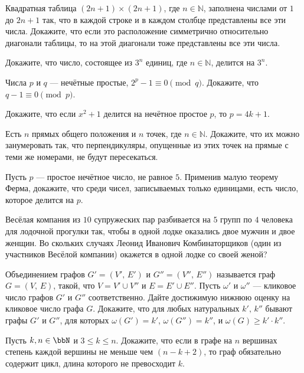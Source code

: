 Квадратная таблица $(2n+1)\times(2n+1)$, где $n\in\mathbb{N}$, заполнена числами от $1$ до $2n+1$ так, что в каждой строке и в каждом столбце представлены все эти числа. Докажите, что если это расположение симметрично относительно диагонали таблицы, то на этой диагонали тоже представлены все эти числа.

Докажите, что число, состоящее из $3^n$ единиц, где $n\in\mathbb{N}$, делится на $3^n$.

Числа $p$ и $q$ --- нечётные простые, $2^p - 1 \equiv 0 \pmod q$. Докажите, что $q - 1 \equiv 0 \pmod p$.

Докажите, что если $x^2+1$ делится на нечётное простое $p$, то $p=4k+1$.


Есть $n$ прямых общего положения и $n$ точек, где $n\in\mathbb{N}$. Докажите, что их можно занумеровать так, что перпендикуляры, опущенные из этих точек на прямые с теми же номерами, не будут пересекаться.


Пусть $p$ --- простое нечётное число, не равное $5$. Применив малую теорему Ферма, докажите, что среди чисел, записываемых только единицами, есть число, которое делится на $p$.

Весёлая компания из $10$ супружеских пар разбивается на $5$ групп по $4$ человека для лодочной прогулки так, чтобы в одной лодке оказались двое мужчин и двое женщин. Во скольких случаях Леонид Иванович Комбинаторщиков (один из участников Весёлой компании) окажется в одной лодке со своей женой?


Объединением графов $G'=(V',\,E')$ и $G''=(V'',\, E'')$ называется граф $G=(V,\,E)$, такой, что $V=V'\cup V''$ и $E=E'\cup E''$. Пусть $\omega'$ и $\omega''$ — кликовое число графов $G'$ и $G''$ соответственно. Дайте достижимую нижнюю оценку на кликовое число графа $G$. Докажите, что для любых натуральных $k',\,k''$ бывают графы $G'$ и $G''$, для которых $\omega(G')=k'$, $\omega(G'')=k''$, и $\omega(G)\ge k'\cdot k''$.


Пусть $k,n\in\bbN$ и $3\le k\le n$. Докажите, что если в графе на $n$ вершинах степень каждой вершины не меньше чем $(n-k+2)$, то граф обязательно содержит цикл, длина которого не превосходит $k$.


